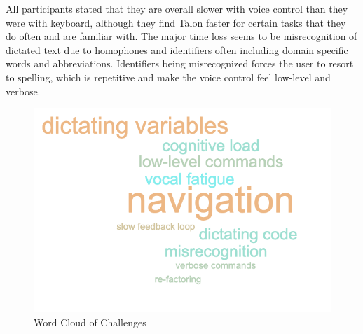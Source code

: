 \documentclass[../thesis.tex]{subfiles}
\begin{document}
All participants stated that they are overall slower with voice control 
than they were with keyboard, although they find Talon faster for certain tasks 
that they do often and are familiar with.
The major time loss seems to be misrecognition of dictated text due to
homophones and identifiers often including domain specific words and abbreviations.
Identifiers being misrecognized forces the user to resort to spelling, 
which is repetitive and make the voice control feel low-level and verbose.

\begin{figure}[htpb]
    \centering
    \includegraphics[width=0.8\linewidth]{images/word_cloud.png}
    \caption{Word Cloud of Challenges}%
    \label{fig:challenges_cloud}
\end{figure}
\end{document}
